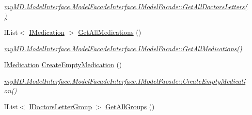\begin{CompactItemize}
\begin{CompactList}\small\item\em \hyperlink{interfacemy_m_d_1_1_model_interface_1_1_model_facade_interface_1_1_i_model_facade_d824e78a8274c2fc04719a66a7030fd7}{my\-MD.Model\-Interface.Model\-Facade\-Interface.IModel\-Facade::Get\-All\-Doctors\-Letters()} \item\end{CompactList}\item 
\hypertarget{classmy_m_d_1_1_model_1_1_model_facade_1_1_model_facade_ecff6715a9c8e9604242cc7a688c9939}{
IList$<$ \hyperlink{interfacemy_m_d_1_1_model_interface_1_1_data_model_interface_1_1_i_medication}{IMedication} $>$ \hyperlink{classmy_m_d_1_1_model_1_1_model_facade_1_1_model_facade_ecff6715a9c8e9604242cc7a688c9939}{Get\-All\-Medications} ()}
\label{d5/dc0/classmy_m_d_1_1_model_1_1_model_facade_1_1_model_facade_ecff6715a9c8e9604242cc7a688c9939}

\begin{CompactList}\small\item\em \hyperlink{interfacemy_m_d_1_1_model_interface_1_1_model_facade_interface_1_1_i_model_facade_ecff6715a9c8e9604242cc7a688c9939}{my\-MD.Model\-Interface.Model\-Facade\-Interface.IModel\-Facade::Get\-All\-Medications()} \item\end{CompactList}\item 
\hypertarget{classmy_m_d_1_1_model_1_1_model_facade_1_1_model_facade_3fd69c99a27372f99eae3cda6e23e2e6}{
\hyperlink{interfacemy_m_d_1_1_model_interface_1_1_data_model_interface_1_1_i_medication}{IMedication} \hyperlink{classmy_m_d_1_1_model_1_1_model_facade_1_1_model_facade_3fd69c99a27372f99eae3cda6e23e2e6}{Create\-Empty\-Medication} ()}
\label{d5/dc0/classmy_m_d_1_1_model_1_1_model_facade_1_1_model_facade_3fd69c99a27372f99eae3cda6e23e2e6}

\begin{CompactList}\small\item\em \hyperlink{interfacemy_m_d_1_1_model_interface_1_1_model_facade_interface_1_1_i_model_facade_3fd69c99a27372f99eae3cda6e23e2e6}{my\-MD.Model\-Interface.Model\-Facade\-Interface.IModel\-Facade::Create\-Empty\-Medication()} \item\end{CompactList}\item 
\hypertarget{classmy_m_d_1_1_model_1_1_model_facade_1_1_model_facade_5975f81012b1229ab03cbfa932f3a8ae}{
IList$<$ \hyperlink{interfacemy_m_d_1_1_model_interface_1_1_data_model_interface_1_1_i_doctors_letter_group}{IDoctors\-Letter\-Group} $>$ \hyperlink{classmy_m_d_1_1_model_1_1_model_facade_1_1_model_facade_5975f81012b1229ab03cbfa932f3a8ae}{Get\-All\-Groups} ()}
\label{d5/dc0/classmy_m_d_1_1_model_1_1_model_facade_1_1_model_facade_5975f81012b1229ab03cbfa932f3a8ae}


\end{CompactItemize}
